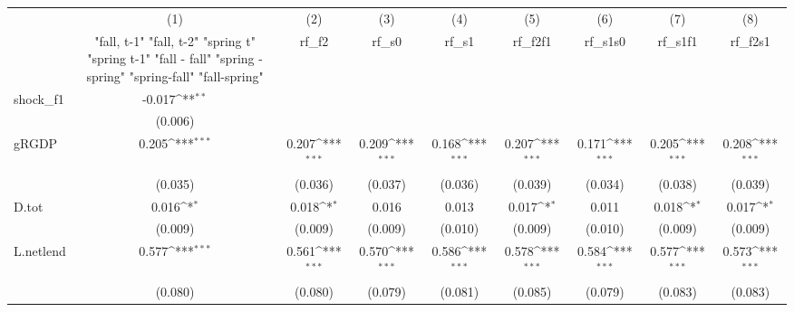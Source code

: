 {
\def\sym#1{\ifmmode^{#1}\else\(^{#1}\)\fi}
\begin{tabular}{l*{8}{c}}
\toprule
            &\multicolumn{1}{c}{(1)}&\multicolumn{1}{c}{(2)}&\multicolumn{1}{c}{(3)}&\multicolumn{1}{c}{(4)}&\multicolumn{1}{c}{(5)}&\multicolumn{1}{c}{(6)}&\multicolumn{1}{c}{(7)}&\multicolumn{1}{c}{(8)}\\
            &\multicolumn{1}{c}{  "fall, t-1" "fall, t-2" "spring t" "spring t-1"  "fall - fall" "spring - spring" "spring-fall" "fall-spring" }&\multicolumn{1}{c}{rf\_f2}&\multicolumn{1}{c}{rf\_s0}&\multicolumn{1}{c}{rf\_s1}&\multicolumn{1}{c}{rf\_f2f1}&\multicolumn{1}{c}{rf\_s1s0}&\multicolumn{1}{c}{rf\_s1f1}&\multicolumn{1}{c}{rf\_f2s1}\\
\midrule
shock\_f1    &      -0.017\sym{**} &                     &                     &                     &                     &                     &                     &                     \\
            &     (0.006)         &                     &                     &                     &                     &                     &                     &                     \\
\addlinespace
gRGDP       &       0.205\sym{***}&       0.207\sym{***}&       0.209\sym{***}&       0.168\sym{***}&       0.207\sym{***}&       0.171\sym{***}&       0.205\sym{***}&       0.208\sym{***}\\
            &     (0.035)         &     (0.036)         &     (0.037)         &     (0.036)         &     (0.039)         &     (0.034)         &     (0.038)         &     (0.039)         \\
\addlinespace
D.tot       &       0.016\sym{*}  &       0.018\sym{*}  &       0.016         &       0.013         &       0.017\sym{*}  &       0.011         &       0.018\sym{*}  &       0.017\sym{*}  \\
            &     (0.009)         &     (0.009)         &     (0.009)         &     (0.010)         &     (0.009)         &     (0.010)         &     (0.009)         &     (0.009)         \\
\addlinespace
L.netlend   &       0.577\sym{***}&       0.561\sym{***}&       0.570\sym{***}&       0.586\sym{***}&       0.578\sym{***}&       0.584\sym{***}&       0.577\sym{***}&       0.573\sym{***}\\
            &     (0.080)         &     (0.080)         &     (0.079)         &     (0.081)         &     (0.085)         &     (0.079)         &     (0.083)         &     (0.083)         \\

\end{tabular}}
